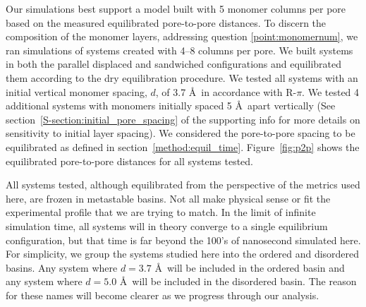 \documentclass[journal=jpcbfk,manusciprt=article]{achemso}
\begin{document}
  Our simulations best support a model built with 5 monomer columns per pore based on
  the measured equilibrated pore-to-pore distances. To discern the composition of
  the monomer layers, addressing question \ref{point:monomernum}, we ran
  simulations of systems created with 4--8 columns per pore. We built systems in both
  the parallel displaced and sandwiched configurations and equilibrated them according
  to the dry equilibration procedure. We tested all systems with an initial vertical monomer 
  spacing, $\mathit{d}$, of 3.7 \AA~in accordance with R-$\pi$. We tested 4 additional systems with
  monomers initially spaced 5 \AA~apart vertically (See section~\ref{S-section:initial_pore_spacing}
  of the supporting info for more details on sensitivity to initial layer spacing). 
  We considered the pore-to-pore spacing to be equilibrated as defined in section~\ref{method:equil_time}.
  Figure~\ref{fig:p2p} shows the equilibrated pore-to-pore distances for all systems tested. 
  
  All systems tested, although equilibrated from the perspective of the metrics used here, are
  frozen in metastable basins. Not all make physical sense or fit the experimental profile that 
  we are trying to match. In the limit of infinite simulation time, all systems will in theory converge to
  a single equilibrium configuration, but that time is far beyond the 100's of nanosecond simulated here. 
  For simplicity, we 
  group the systems studied here into the ordered and disordered basins. Any system where 
  $\mathit{d}=3.7$ \AA~will be included in the
  ordered basin and any system where $\mathit{d}=5.0$ \AA~will be included in the disordered basin.
  The reason for these names will become clearer as we progress through our analysis.
  
\end{document}
